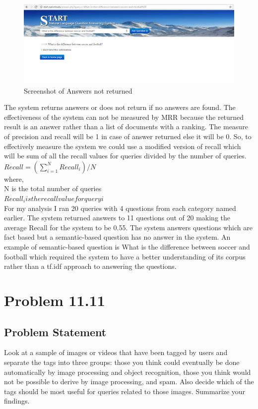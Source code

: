 \documentclass[12pt]{report}
\begin{document}
\begin{figure}[ht]
  \centering
  \includegraphics[width=1\textwidth]{Problem11_9/NoAnswer.png}
  \caption{Screenshot of Answers not returned}
  \label{fig:1}
\end{figure} 
The system returns answers or does not return if no answers are found. The effectiveness of the system can not be measured by MRR because the returned result is an answer rather than a list of documents with a ranking. The measure of precision and recall will be 1 in case of answer returned else it will be 0. So, to effectively measure the system we could use a modified version of recall which will be sum of all the recall values for queries divided by the number of queries.\\
$Recall = (\sum\limits_{i=1}^N Recall_i) /N$\\
where,\\
N is the total number of queries\\
$Recall_i is the recall value for query i$ \\
For my analysis I ran 20 queries with 4 questions from each category named earlier. The system returned answers to 11 questions out of 20 making the  average Recall for the system to be 0.55. The system answers questions which are fact based but a semantic-based question has no answer in the system. An example of semantic-based question is What is the difference between soccer and football which required the system to have a better understanding of its corpus rather than a tf.idf approach to answering the questions. 
\chapter{Problem 11.11}
\section{Problem Statement}
Look at a sample of images or videos that have been tagged by users and separate the tags into three groups: those you think could eventually be done automatically by image processing and object recognition, those you think would not be possible to derive by image processing, and spam. Also decide which of the tags should be most useful for queries related to those images. Summarize your findings.
\end{document}
